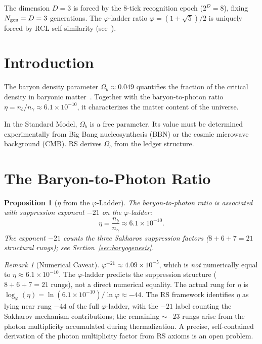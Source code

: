 \documentclass[12pt,a4paper]{article}
\newtheorem{proposition}[theorem]{Proposition}
\theoremstyle{definition}
\theoremstyle{remark}
\newtheorem{remark}[theorem]{Remark}
\begin{document}
\noindent The dimension $D=3$ is forced by the 8-tick recognition
epoch ($2^D=8$), fixing $N_{\rm gen}=D=3$ generations.  The
$\varphi$-ladder ratio $\varphi = (1+\sqrt{5})/2$ is uniquely
forced by RCL self-similarity (see~\cite{RS_Axioms}).

\section{Introduction}
\label{sec:intro}

The baryon density parameter $\Omega_b \approx 0.049$ quantifies
the fraction of the critical density in baryonic
matter~\cite{Planck2020}.  Together with the baryon-to-photon
ratio $\eta = n_b/n_\gamma \approx 6.1 \times 10^{-10}$, it
characterizes the matter content of the universe.

In the Standard Model, $\Omega_b$ is a free parameter.  Its
value must be determined experimentally from Big Bang
nucleosynthesis (BBN) or the cosmic microwave background (CMB).
RS derives $\Omega_b$ from the ledger structure.

\section{The Baryon-to-Photon Ratio}
\label{sec:eta}

\begin{proposition}[$\eta$ from the $\varphi$-Ladder]
\label{thm:eta}
The baryon-to-photon ratio is associated with suppression
exponent $-21$ on the $\varphi$-ladder:
\begin{equation}
  \eta = \frac{n_b}{n_\gamma} \approx 6.1 \times 10^{-10}.
\end{equation}
The exponent $-21$ counts the three Sakharov suppression factors
($8 + 6 + 7 = 21$ structural rungs); see Section~\ref{sec:baryogenesis}.
\end{proposition}

\begin{remark}[Numerical Caveat]
\label{rem:eta-numerical}
$\varphi^{-21} \approx 4.09 \times 10^{-5}$, which is \emph{not}
numerically equal to $\eta \approx 6.1 \times 10^{-10}$.  The
$\varphi$-ladder predicts the suppression structure ($8+6+7 = 21$
rungs), not a direct numerical equality.  The actual rung
for $\eta$ is $\log_\varphi(\eta) = \ln(6.1\times10^{-10})/\ln\varphi
\approx -44$.  The RS framework identifies $\eta$ as lying near rung
$-44$ of the full $\varphi$-ladder, with the $-21$ label counting
the Sakharov mechanism contributions; the remaining $\sim -23$ rungs
arise from the photon multiplicity accumulated during thermalization.
A precise, self-contained derivation of the photon multiplicity factor
from RS axioms is an open problem.
\end{remark}
\end{document}
